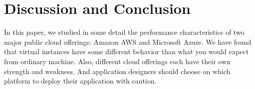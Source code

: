 \section{Discussion and Conclusion}
\label{section:conclusion}

In this paper, we studied in some detail the performance characteristics of two major public cloud offerings: Amazon AWS and Microsoft Azure. We have found that virtual instances have some different behavior than what you would expect from ordinary machine. Also, different cloud offerings each have their own strength and weakness. And application designers should choose on which platform to deploy their application with caution.
